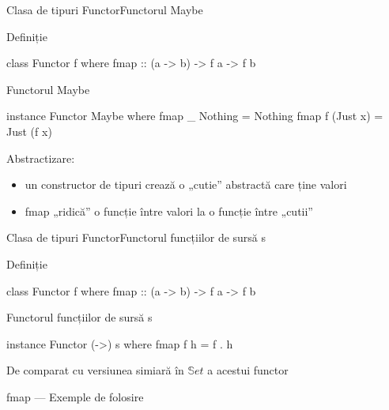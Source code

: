 \documentclass[xcolor=pdftex,romanian,colorlinks]{beamer}
\begin{document}
\begin{frame}[fragile]{Clasa de tipuri Functor}{Functorul Maybe}
\begin{block}{Definiție}
\vspace{-1ex}
\begin{asciihs}
class Functor f where
  fmap :: (a -> b) -> f a -> f b
\end{asciihs}
\end{block}


\begin{block}{Functorul Maybe}
\vspace{-1ex}
\begin{asciihs}
instance Functor Maybe where
  fmap _ Nothing  = Nothing
  fmap f (Just x) = Just (f x)
\end{asciihs}
\end{block}

\begin{block}{Abstractizare:}
\begin{itemize}
\item un constructor de tipuri crează o „cutie” abstractă care ține valori
\item fmap „ridică” o funcție între valori la o funcție între „cutii”
\end{itemize}
\end{block}
\end{frame}


\begin{frame}[fragile]{Clasa de tipuri Functor}{Functorul funcțiilor de sursă s}
\begin{block}{Definiție}
\vspace{-1ex}
\begin{asciihs}
class Functor f where
  fmap :: (a -> b) -> f a -> f b
\end{asciihs}
\end{block}

\begin{block}{Functorul funcțiilor de sursă s}
\vspace{-1ex}
\begin{asciihs}
instance Functor (->) s where
  fmap f h  = f . h
\end{asciihs}
\vspace{-1ex}
De comparat cu versiunea simiară în $\mathbb{S}et$ a acestui functor
\end{block}
\end{frame}

\begin{frame}[fragile]{fmap --- Exemple de folosire}
\vspace{-1ex}
\end{frame}
\end{document}
